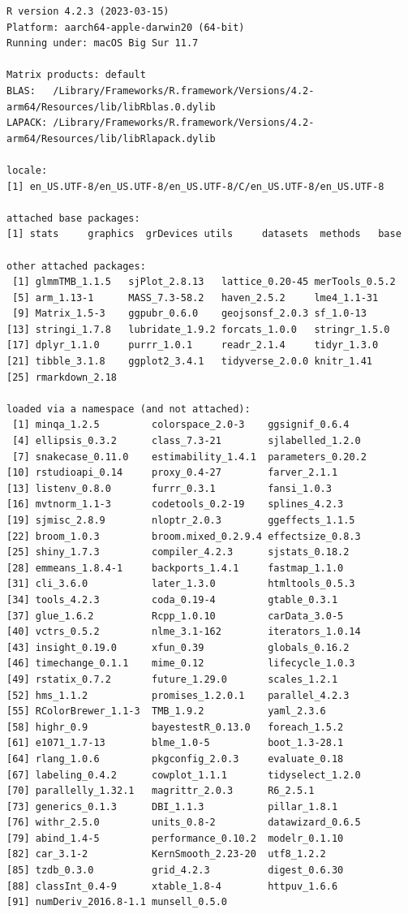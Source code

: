 \documentclass[
]{article}
\begin{document}
\begin{verbatim}
R version 4.2.3 (2023-03-15)
Platform: aarch64-apple-darwin20 (64-bit)
Running under: macOS Big Sur 11.7

Matrix products: default
BLAS:   /Library/Frameworks/R.framework/Versions/4.2-arm64/Resources/lib/libRblas.0.dylib
LAPACK: /Library/Frameworks/R.framework/Versions/4.2-arm64/Resources/lib/libRlapack.dylib

locale:
[1] en_US.UTF-8/en_US.UTF-8/en_US.UTF-8/C/en_US.UTF-8/en_US.UTF-8

attached base packages:
[1] stats     graphics  grDevices utils     datasets  methods   base     

other attached packages:
 [1] glmmTMB_1.1.5   sjPlot_2.8.13   lattice_0.20-45 merTools_0.5.2 
 [5] arm_1.13-1      MASS_7.3-58.2   haven_2.5.2     lme4_1.1-31    
 [9] Matrix_1.5-3    ggpubr_0.6.0    geojsonsf_2.0.3 sf_1.0-13      
[13] stringi_1.7.8   lubridate_1.9.2 forcats_1.0.0   stringr_1.5.0  
[17] dplyr_1.1.0     purrr_1.0.1     readr_2.1.4     tidyr_1.3.0    
[21] tibble_3.1.8    ggplot2_3.4.1   tidyverse_2.0.0 knitr_1.41     
[25] rmarkdown_2.18 

loaded via a namespace (and not attached):
 [1] minqa_1.2.5         colorspace_2.0-3    ggsignif_0.6.4     
 [4] ellipsis_0.3.2      class_7.3-21        sjlabelled_1.2.0   
 [7] snakecase_0.11.0    estimability_1.4.1  parameters_0.20.2  
[10] rstudioapi_0.14     proxy_0.4-27        farver_2.1.1       
[13] listenv_0.8.0       furrr_0.3.1         fansi_1.0.3        
[16] mvtnorm_1.1-3       codetools_0.2-19    splines_4.2.3      
[19] sjmisc_2.8.9        nloptr_2.0.3        ggeffects_1.1.5    
[22] broom_1.0.3         broom.mixed_0.2.9.4 effectsize_0.8.3   
[25] shiny_1.7.3         compiler_4.2.3      sjstats_0.18.2     
[28] emmeans_1.8.4-1     backports_1.4.1     fastmap_1.1.0      
[31] cli_3.6.0           later_1.3.0         htmltools_0.5.3    
[34] tools_4.2.3         coda_0.19-4         gtable_0.3.1       
[37] glue_1.6.2          Rcpp_1.0.10         carData_3.0-5      
[40] vctrs_0.5.2         nlme_3.1-162        iterators_1.0.14   
[43] insight_0.19.0      xfun_0.39           globals_0.16.2     
[46] timechange_0.1.1    mime_0.12           lifecycle_1.0.3    
[49] rstatix_0.7.2       future_1.29.0       scales_1.2.1       
[52] hms_1.1.2           promises_1.2.0.1    parallel_4.2.3     
[55] RColorBrewer_1.1-3  TMB_1.9.2           yaml_2.3.6         
[58] highr_0.9           bayestestR_0.13.0   foreach_1.5.2      
[61] e1071_1.7-13        blme_1.0-5          boot_1.3-28.1      
[64] rlang_1.0.6         pkgconfig_2.0.3     evaluate_0.18      
[67] labeling_0.4.2      cowplot_1.1.1       tidyselect_1.2.0   
[70] parallelly_1.32.1   magrittr_2.0.3      R6_2.5.1           
[73] generics_0.1.3      DBI_1.1.3           pillar_1.8.1       
[76] withr_2.5.0         units_0.8-2         datawizard_0.6.5   
[79] abind_1.4-5         performance_0.10.2  modelr_0.1.10      
[82] car_3.1-2           KernSmooth_2.23-20  utf8_1.2.2         
[85] tzdb_0.3.0          grid_4.2.3          digest_0.6.30      
[88] classInt_0.4-9      xtable_1.8-4        httpuv_1.6.6       
[91] numDeriv_2016.8-1.1 munsell_0.5.0      
\end{verbatim}
\end{document}
